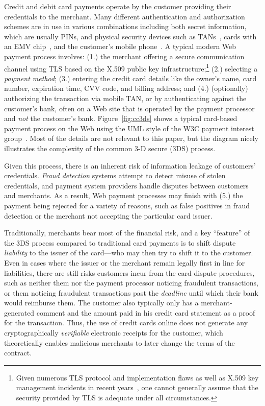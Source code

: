 \documentclass{llncs}
\begin{document}
Credit and debit card payments operate by the customer providing their
credentials to the merchant.  Many different authentication and
authorization schemes are in use in various combinations including
both secret information, which are usually PINs, and physical security
devices such as TANs~\cite{kobil2016tan}, cards with an EMV
chip~\cite{emv}, and the customer's mobile phone~\cite{mtan}.  A
typical modern Web payment process involves: {(1.)} the merchant
offering a secure communication channel using TLS based on the X.509
public key infrastructure;\footnote{Given numerous TLS protocol and
  implementation flaws as well as X.509 key management incidents in
  recent years~\cite{holz2014}, one cannot generally assume that the
  security provided by TLS is adequate under all circumstances.}
{(2.)} selecting a {\em payment method}; {(3.)} entering the credit
card details like the owner's name, card number, expiration time, CVV
code, and billing address; and {(4.)} (optionally) authorizing the
transaction via mobile TAN, or by authenticating against the
customer's bank, often on a Web site that is operated by the payment
processor and {\em not} the customer's bank.  Figure~\ref{fig:cc3ds}
shows a typical card-based payment process on the Web using the
UML style of the W3C payment interest group~\cite{pigs}.  Most of the details
are not relevant to this paper, but the diagram nicely illustrates the
complexity of the common 3-D secure (3DS) process.

Given this process, there is an inherent risk of information leakage
of customers' credentials.  {\em Fraud detection} systems attempt to detect
misuse of stolen credentials, and payment system providers handle
disputes between customers and merchants.  As a result, Web payment
processes may finish with {(5.)} the payment being rejected for a
variety of reasons, such as false positives in fraud detection or
the merchant not accepting the particular card issuer.

Traditionally, merchants bear most of the financial risk, and a key
``feature'' of the 3DS process compared to traditional card payments
is to shift dispute {\em liability} to the issuer of the card---who
may then try to shift it to the customer.
%
%
Even in cases where the issuer or the merchant remain legally first in
line for liabilities, there are still risks customers incur from the
card dispute procedures, such as neither them nor the payment
processor noticing fraudulent transactions, or them noticing
fraudulent transactions past the {\em deadline} until which their bank
would reimburse them.  The customer also typically only has a
merchant-generated comment and the amount paid in his credit card
statement as a proof for the transaction.  Thus, the use of credit
cards online does not generate any cryptographically {\em verifiable}
electronic receipts for the customer, which theoretically enables
malicious merchants to later change the terms of the contract.
\end{document}

